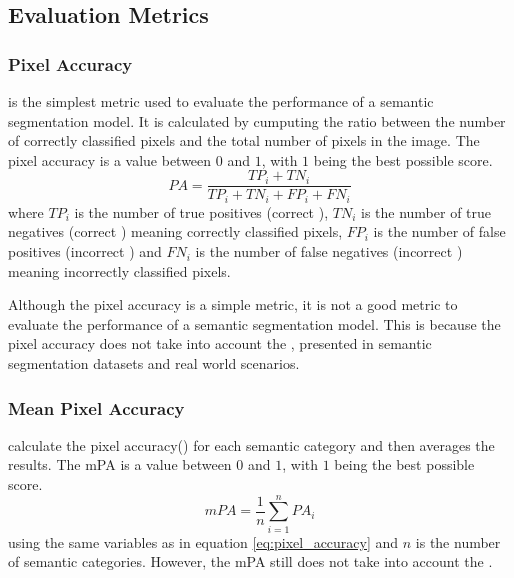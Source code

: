   \subsection{Evaluation Metrics}

    \subsubsection{Pixel Accuracy}

       is the simplest metric used to evaluate the performance
      of a semantic segmentation model. It is calculated by cumputing the ratio
      between the number of correctly classified pixels and the total number of
      pixels in the image\cite{long2015fully}. The pixel accuracy is a value between
      $0$ and $1$, with $1$ being the best possible score.
      \begin{equation}
        \label{eq:pixel_accuracy}
        PA = \frac{TP_i + TN_i}{TP_i + TN_i + FP_i + FN_i}
      \end{equation}
      where $TP_i$ is the number of true positives (correct ),
      $TN_i$ is the number of true negatives (correct )
      meaning correctly classified pixels, $FP_i$ is the number of false positives
      (incorrect ) and $FN_i$ is the number of false negatives
      (incorrect ) meaning incorrectly classified pixels.

      Although the pixel accuracy is a simple metric, it is not a good metric to
      evaluate the performance of a semantic segmentation model. This is because
      the pixel accuracy does not take into account the ,
      presented in semantic segmentation datasets and real world scenarios.
      
    \subsubsection{Mean Pixel Accuracy}

       calculate the pixel accuracy() for each
      semantic category and then averages the results\cite{long2015fully}. The mPA is a value between $0$ and $1$,
      with $1$ being the best possible score.
      \begin{equation}
        \label{eq:mean_pixel_accuracy}
        mPA = \frac{1}{n} \sum_{i=1}^{n} PA_i
      \end{equation}
      using the same variables as in equation \ref{eq:pixel_accuracy} and $n$ is the
      number of semantic categories. However, the mPA still does not take into account
      the .

